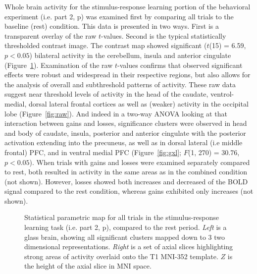 \documentclass[doc,12pt]{apa}        %
\begin{document}
Whole brain activity for the stimulus-response learning portion of the behavioral experiment (i.e. part 2, p\pageref{subsub:whatwhen}) was examined first by comparing all trials to the baseline (rest) condition.  This data is presented in two ways.  First is a transparent overlay of the raw $t$-values.  Second is the typical statistically thresholded contrast image.  The contrast map showed significant ($t$(15) = 6.59, $p< 0.05$) bilateral activity in the cerebellum, insula and anterior cingulate (Figure~\ref{fig:gl}).  Examination of the raw $t$-values confirms that observed significant effects were robust and widespread in their respective regions, but also allows for the analysis of overall and subthreshold patterns of activity.  These raw data suggest near threshold levels of activity in the head of the caudate, ventrol-medial, dorsal lateral frontal cortices as well as (weaker) activity in the occipital lobe (Figure~\ref{fig:raw}).  And indeed in a two-way ANOVA looking at that interaction between gains and losses, significance clusters were observed in head and body of caudate, insula, posterior and anterior cingulate with the posterior activation extending into the precuneus, as well as in dorsal lateral (i.e middle frontal) PFC, and in ventral medial PFC (Figure~\ref{fig:gxl}; $F$(1, 270) = 30.76, $p < 0.05$).  When trials with gains and losses were examined separately compared to rest, both resulted in activity in the same areas as in the combined condition (not shown).  However, losses showed both increases and decreased of the BOLD signal compared to the rest condition, whereas gains exhibited only increases (not shown).

\begin{figure}[tp]
    \centering
    \caption{Statistical parametric map for all trials in the stimulus-response learning task (i.e. part 2, p\pageref{subsub:whatwhen}), compared to the rest period.  \emph{Left} is a glass brain, showing all significant clusters mapped down to 3 two dimensional representations.  \emph{Right} is a set of axial slices highlighting strong areas of activity overlaid onto the T1 MNI-352 template.  $Z$ is the height of the axial slice in MNI space.}
	\label{fig:gl}
\end{figure}
\end{document}
